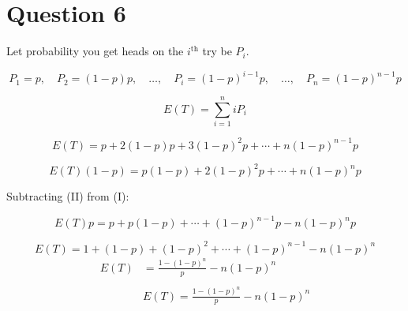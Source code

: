 \documentclass[12pt]{article}
\begin{document}
\section{Question 6}
Let probability you get heads on the $i^{\text{th}}$ try be $P_i$.

\[
P_1 = p, \quad 
P_2 = (1-p)p, \quad 
\dots, \quad 
P_i = (1-p)^{i-1}p, \quad 
\dots, \quad 
P_n = (1-p)^{n-1}p
\]

\[
E(T) = \sum_{i=1}^n i P_i
\]

\[
E(T) = p + 2(1-p)p + 3(1-p)^2p + \cdots + n(1-p)^{n-1}p \tag{I}
\]

\[
E(T)(1-p) = p(1-p) + 2(1-p)^2p + \cdots + n(1-p)^np \tag{II}
\]

Subtracting (II) from (I):

\[
E(T)p = p + p(1-p) + \cdots + (1-p)^{n-1}p - n(1-p)^np
\]

\[
E(T) = 1 + (1-p) + (1-p)^2 + \cdots + (1-p)^{n-1} - n(1-p)^n
\]
\[
\begin{aligned}
E(T) &= \frac{1 - (1-p)^n}{p} - n(1-p)^n \\
& \\
&\boxed{E(T) = \frac{1 - (1-p)^n}{p} - n(1-p)^n}
\end{aligned}
\]
\end{document}

